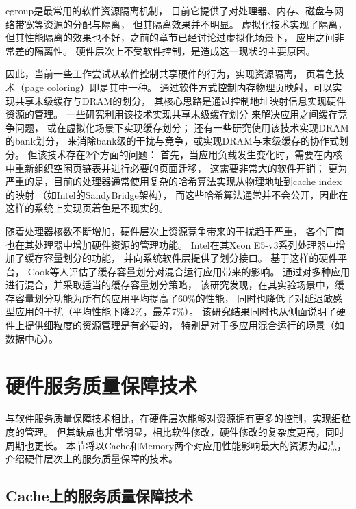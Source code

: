 cgroup\cite{cgroup}是最常用的软件资源隔离机制，
目前它提供了对处理器、内存、磁盘与网络带宽等资源的分配与隔离，
但其隔离效果并不明显。
虚拟化技术实现了隔离，但其性能隔离的效果也不好，之前的章节已经讨论过虚拟化场景下，
应用之间非常差的隔离性。
硬件层次上不受软件控制，是造成这一现状的主要原因。

因此，当前一些工作尝试从软件控制共享硬件的行为，实现资源隔离，
页着色技术（page coloring）即是其中一种。
通过软件方式控制内存物理页映射，可以实现共享末级缓存与DRAM的划分，
其核心思路是通过控制地址映射信息实现硬件资源的管理。
一些研究利用该技术实现共享末级缓存划分\cite{lin_gaining_2008, tam_managing_2007}
来解决应用之间缓存竞争问题，
或在虚拟化场景下实现缓存划分\cite{Jin2009, Chen2010, Wang2012}；
还有一些研究\cite{liu_software_2012}使用该技术实现DRAM的bank划分，
来消除bank级的干扰与竞争，或实现DRAM与末级缓存的协作式划分\cite{Liu:2014:ISCA}。
但该技术存在2个方面的问题：
首先，当应用负载发生变化时，需要在内核中重新组织空闲页链表并进行必要的页面迁移，
这需要非常大的软件开销；
更为严重的是，目前的处理器通常使用复杂的哈希算法实现从物理地址到cache index的映射
（如Intel的SandyBridge架构），
而这些哈希算法通常并不会公开，因此在这样的系统上实现页着色是不现实的。

随着处理器核数不断增加，硬件层次上资源竞争带来的干扰趋于严重，
各个厂商也在其处理器中增加硬件资源的管理功能。
Intel在其Xeon E5-v3系列处理器中增加了缓存容量划分的功能，
并向系统软件层提供了划分接口。
基于这样的硬件平台，
Cook等人\cite{cook_hardware_2013}评估了缓存容量划分对混合运行应用带来的影响。
通过对多种应用进行混合，并采取适当的缓存容量划分策略，
该研究发现，在其实验场景中，缓存容量划分功能为所有的应用平均提高了60\%的性能，
同时也降低了对延迟敏感型应用的干扰（平均性能下降2\%，最差7\%）。
该研究结果同时也从侧面说明了硬件上提供细粒度的资源管理是有必要的，
特别是对于多应用混合运行的场景（如数据中心）。



\section{硬件服务质量保障技术}

与软件服务质量保障技术相比，在硬件层次能够对资源拥有更多的控制，实现细粒度的管理。
但其缺点也非常明显，相比软件修改，硬件修改的复杂度更高，同时周期也更长。
本节将以Cache和Memory两个对应用性能影响最大的资源为起点，
介绍硬件层次上的服务质量保障的技术。


\subsection{Cache上的服务质量保障技术}

